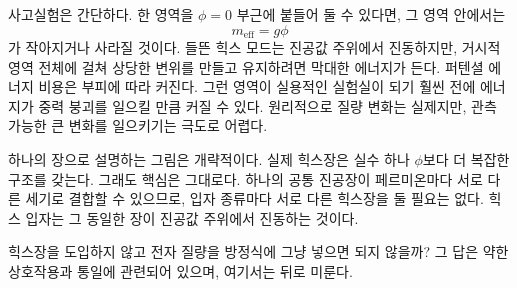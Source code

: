 \begin{classroomqa}
\end{classroomqa}

사고실험은 간단하다. 한 영역을 \(\phi=0\) 부근에 붙들어 둘 수 있다면, 그 영역 안에서는
\begin{equation}
m_{\mathrm{eff}}=g\phi
\end{equation}
가 작아지거나 사라질 것이다. 들뜬 힉스 모드는 진공값 주위에서 진동하지만, 거시적 영역 전체에 걸쳐 상당한 변위를 만들고 유지하려면 막대한 에너지가 든다. 퍼텐셜 에너지 비용은 부피에 따라 커진다. 그런 영역이 실용적인 실험실이 되기 훨씬 전에 에너지가 중력 붕괴를 일으킬 만큼 커질 수 있다. 원리적으로 질량 변화는 실제지만, 관측 가능한 큰 변화를 일으키기는 극도로 어렵다.

\begin{classroomqa}
\end{classroomqa}

\begin{classroomqa}
\end{classroomqa}

하나의 장으로 설명하는 그림은 개략적이다. 실제 힉스장은 실수 하나 \(\phi\)보다 더 복잡한 구조를 갖는다. 그래도 핵심은 그대로다. 하나의 공통 진공장이 페르미온마다 서로 다른 세기로 결합할 수 있으므로, 입자 종류마다 서로 다른 힉스장을 둘 필요는 없다. 힉스 입자는 그 동일한 장이 진공값 주위에서 진동하는 것이다.

힉스장을 도입하지 않고 전자 질량을 방정식에 그냥 넣으면 되지 않을까? 그 답은 약한 상호작용과 통일에 관련되어 있으며, 여기서는 뒤로 미룬다.

\begin{classroomqa}
\end{classroomqa}

